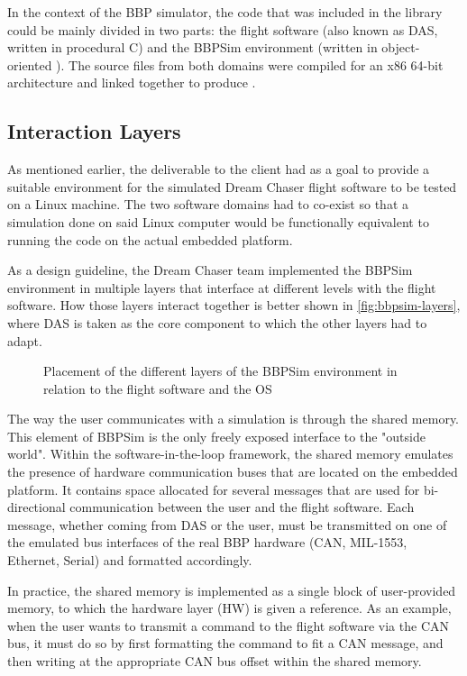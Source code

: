 {In the context of the \gls{BBP} simulator, the code that was included in the library could be mainly divided in two parts: the flight software (also known as \gls{DAS}, written in procedural C) and the \gls{BBPSim} environment (written in object-oriented \Cpp). The source files from both domains were compiled for an x86 64-bit architecture and linked together to produce .

\subsection*{Interaction Layers}
As mentioned earlier, the deliverable to the client had as a goal to provide a suitable environment for the simulated Dream Chaser flight software to be tested on a Linux machine. The two software domains had to co-exist so that a simulation done on said Linux computer would be functionally equivalent to running the code on the actual embedded platform. 

As a design guideline, the Dream Chaser team implemented the \gls{BBPSim} environment in multiple layers that interface at different levels with the flight software. How those layers interact together is better shown in \autoref{fig:bbpsim-layers}, where \gls{DAS} is taken as the core component to which the other layers had to adapt.

\begin{figure}[htbp]
	\vspace{12pt}
	\centering
	
	\caption{Placement of the different layers of the BBPSim environment in relation to the flight software and the OS}
	\label{fig:bbpsim-layers}
\end{figure}

The way the user communicates with a simulation is through the shared memory. This element of \gls{BBPSim} is the only freely exposed interface to the "outside world". Within the software-in-the-loop framework, the shared memory emulates the presence of hardware communication buses that are located on the embedded platform. It contains space allocated for several messages that are used for bi-directional communication between the user and the flight software. Each message, whether coming from DAS or the user, must be transmitted on one of the emulated bus interfaces of the real \gls{BBP} hardware (CAN, MIL-1553, Ethernet, Serial) and formatted accordingly.

In practice, the shared memory is implemented as a single block of user-provided memory, to which the hardware layer (HW) is given a reference. As an example, when the user wants to transmit a command to the flight software via the CAN bus, it must do so by first formatting the command to fit a CAN message, and then writing at the appropriate CAN bus offset within the shared memory. 

}
